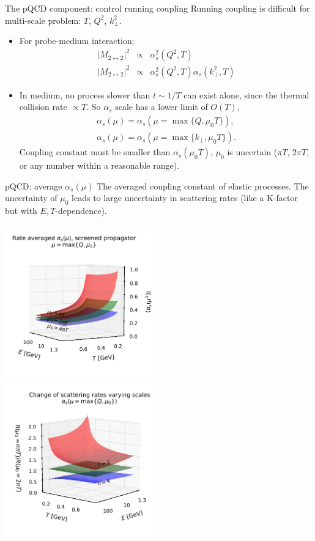 \documentclass[11pt]{beamer}
\begin{document}
\begin{frame}{The pQCD component: control running coupling}
Running coupling is difficult for multi-scale problem:
$T$, $Q^2$, $k_\perp^2$.
\begin{itemize}
\item For probe-medium interaction:
\begin{eqnarray}
\nonumber
|M_{2\leftrightarrow 2}|^2 &\propto& \alpha_s^2(Q^2, T) \\
\nonumber
|M_{2\leftrightarrow 2}|^2 &\propto& \alpha_s^2(Q^2, T) \alpha_s(k_\perp^2, T)
\end{eqnarray}
\item In medium, no process slower than $t\sim 1/T$ can exist alone, since the thermal collision rate $\propto T$. So $\alpha_s$ scale has a lower limit of $O(T)$,
\begin{eqnarray}
\nonumber
\alpha_s(\mu) = \alpha_s(\mu = \max\{Q, \mu_0 T\}),\\
\nonumber
\alpha_s(\mu) = \alpha_s(\mu = \max\{k_\perp, \mu_0 T\}).
\end{eqnarray}
Coupling constant must be smaller than $\alpha_s(\mu_0 T)$, $\mu_0$ is uncertain ($\pi T$, $2\pi T$, or any number within a reasonable range).
\end{itemize}
\end{frame}

\begin{frame}{pQCD: average $\alpha_s(\mu)$}
The averaged coupling constant of elastic processes. The uncertainty of $\mu_0$ leads to large uncertainty in scattering rates (like a K-factor but with $E, T$-dependence).
\begin{center}
\includegraphics[width=0.5\textwidth]{fig/charm-plot/avg_alphas.pdf}
\includegraphics[width=0.5\textwidth]{fig/charm-plot/Rscale.pdf}
\end{center}
\end{frame}
\end{document}
